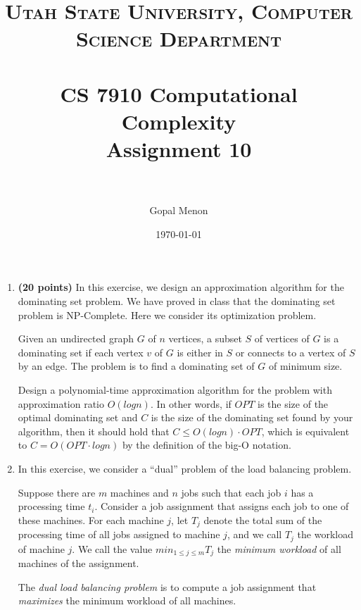 \documentclass[paper=a4, fontsize=11pt]{scrartcl} %
\title{	
\normalfont \normalsize 
\textsc{Utah State University, Computer Science Department} \\ [25pt] %
\horrule{0.5pt} \\[0.4cm] %
\huge CS 7910 Computational Complexity\\Assignment 10\\ %
\horrule{2pt} \\[0.5cm] %
}
\author{Gopal Menon} %
\date{\normalsize\today} %
\numberwithin{figure}{section} %
\numberwithin{table}{section} %
\begin{document}
\maketitle %

\begin{enumerate}
\item \textbf{(20 points)} In this exercise, we design an approximation algorithm for the dominating set
problem. We have proved in class that the dominating set problem is NP-Complete. Here we consider its optimization problem.

Given an undirected graph $G$ of $n$ vertices, a subset $S$ of vertices of $G$ is a dominating set if
each vertex $v$ of $G$ is either in $S$ or connects to a vertex of $S$ by an edge. The problem is to
find a dominating set of $G$ of minimum size.

Design a polynomial-time approximation algorithm for the problem with approximation ratio
$O(log n)$. In other words, if $OPT$ is the size of the optimal dominating set and $C$ is the size
of the dominating set found by your algorithm, then it should hold that $C \leq O(log n) \cdot OP T$,
which is equivalent to $C = O(OPT \cdot log n)$ by the definition of the big-O notation.

\item In this exercise, we consider a \enquote{dual} problem of the load balancing problem.

Suppose there are $m$ machines and $n$ jobs such that each job $i$ has a processing time $t_i$.
Consider a job assignment that assigns each job to one of these machines. For each machine
$j$, let $T_j$ denote the total sum of the processing time of all jobs assigned to machine $j$, and
we call $T_j$ the workload of machine $j$. We call the value $min_{1 \leq j \leq m} T_j$ the \textit{minimum workload} of all machines of the assignment.

The \textit{dual load balancing problem} is to compute a job assignment that \textit{maximizes} the minimum
workload of all machines.


\end{enumerate}
\end{document}

